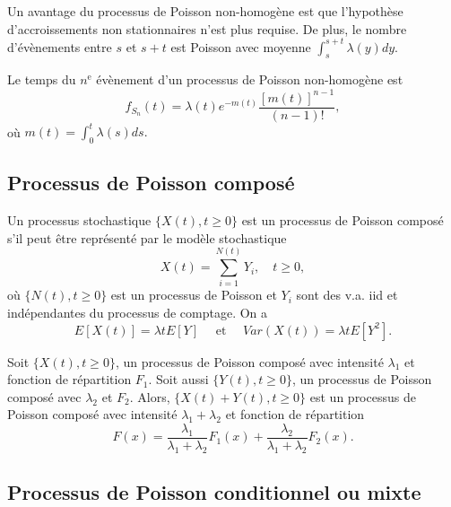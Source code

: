 
Un avantage du processus de Poisson non-homogène est que l'hypothèse d'accroissements non stationnaires n'est plus requise. De plus, le nombre d'évènements entre $s$ et $s + t$ est Poisson avec moyenne $\int_{s}^{s+ t}\lambda(y) dy.$

\begin{definition}{}{}
	Le temps du $n^\text{e}$ évènement d'un processus de Poisson non-homogène est 
	$$f_{S_n}(t)= \lambda(t) e^{-m(t)}\frac{[m(t)]^{n-1}}{(n-1)!},$$
	où $m(t) = \int_{0}^{t}\lambda(s) ds.$
\end{definition}

\subsection{Processus de Poisson composé}

Un processus stochastique $\{X(t), t\geq 0\}$ est un processus de Poisson composé s'il peut être représenté par le modèle stochastique 
$$X(t)= \sum_{i = 1}^{N(t)}Y_i, \quad t\geq 0,$$
où $\{N(t), t \geq 0\}$ est un processus de Poisson et $Y_i$ sont des v.a. iid et indépendantes du processus de comptage. On a 
$$E[X(t)] = \lambda t E[Y] \quad \text{ et } \quad Var(X(t)) = \lambda t E[Y^2].$$

\begin{propriete}{}{}
	Soit $\{X(t), t \geq 0\}$, un processus de Poisson composé avec intensité $\lambda_1$ et fonction de répartition $F_1$. Soit aussi $\{Y(t), t \geq 0\}$, un processus de Poisson composé avec $\lambda_2$ et $F_2$. Alors, $\{X(t) + Y(t),t\geq 0\}$ est un processus de Poisson composé avec intensité $\lambda_1 + \lambda_2$ et fonction de répartition
	$$F(x) = \frac{\lambda_1}{\lambda_1 + \lambda_2} F_1(x) + \frac{\lambda_2}{\lambda_1 + \lambda_2} F_2(x).$$
\end{propriete}

\subsection{Processus de Poisson conditionnel ou mixte}

